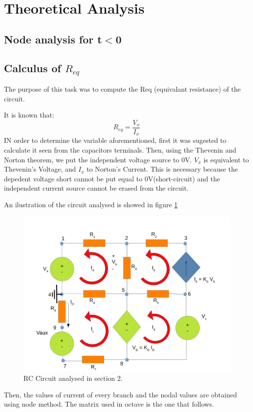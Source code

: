 \section{Theoretical Analysis} \label{section:theo}


\subsection{Node analysis for t$<$0}




\subsection{Calculus of $R_{eq}$}

The purpose of this task was to compute the Req (equivalant resistance) of the circuit.

It is known that:
\begin{equation}
R_{eq}=\frac{V_{x}}{I_{x}}
\end{equation}
IN order to determine the variable aforementioned, first it was sugested to calculate it seen from the capacitors terminals. Then, using the Thevenin and Norton theorem, we put the independent voltage source to 0V. $V_{x}$ is equivalent to Thevenin's Voltage, and $I_{x}$ to Norton's Current. This is necessary because the depedent voltage short cannot be put equal to 0V(short-circuit) and the independent current source cannot be erased from the circuit.
\par An ilustration of the circuit analysed is showed in figure \ref{sim2draw} 
\begin{figure}[h] \centering
\includegraphics[width=0.8\linewidth]{sim2draw.pdf}
\caption{RC Circuit analysed in section 2.}
\label{sim2draw}
\end{figure}
\par
Then, the values of current of  every branch and the nodal values are obtained using node method. The matrix used in octave is the one that follows.

